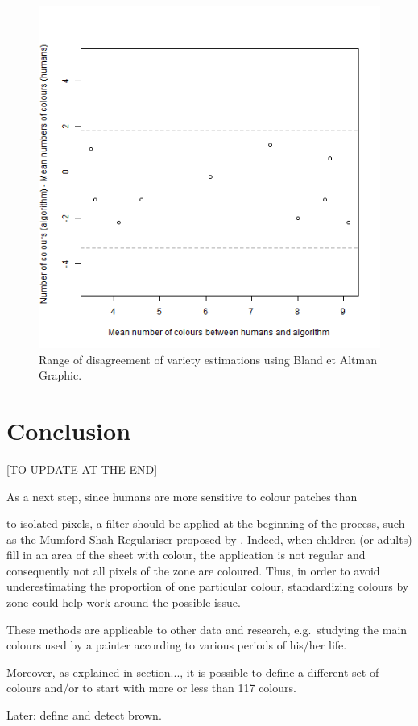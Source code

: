 \documentclass[11pt,a4paper]{article}
\begin{document}
\begin{figure}[h!]
	\centering
	\includegraphics[width=\linewidth]{figures/comp_nb_colours_agreement.png}
	\caption{Range of disagreement of variety estimations using Bland et Altman  Graphic.}
	\label{fig:blandandaltman}
\end{figure}



\section{Conclusion}

{\color{red}[TO UPDATE AT THE END] }
{\color{gray} As a next step, since humans are more sensitive to colour patches than

to isolated pixels, a filter should be applied at the beginning of the
process, such as the Mumford-Shah Regulariser proposed by
\citet{erdem2009}. Indeed, when children (or adults) fill in an area of
the sheet with colour, the application is not regular and consequently
not all pixels of the zone are coloured. Thus, in order to avoid
underestimating the proportion of one particular colour, standardizing
colours by zone could help work around the possible issue.}

These methods are
applicable to other data and research, e.g.~studying the main colours
used by a painter according to various periods of his/her life.

Moreover, as explained in section..., it is possible to define a different set of colours and/or to start with more or less than 117 colours.

Later: define and detect brown.



\end{document}
